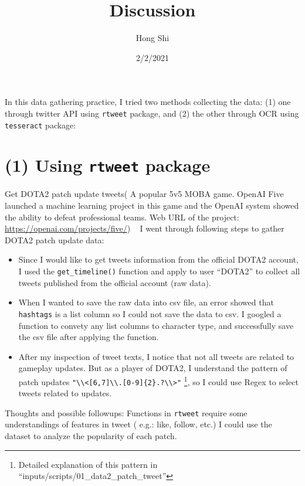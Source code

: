 \documentclass[
]{article}
\title{Discussion}
\author{Hong Shi}
\date{2/2/2021}
\begin{document}
\maketitle

In this data gathering practice, I tried two methods collecting the
data: (1) one through twitter API using \texttt{rtweet} package, and (2)
the other through OCR using \texttt{tesseract} package:

\hypertarget{using-rtweet-package}{%
\section{\texorpdfstring{(1) Using \texttt{rtweet}
package}{(1) Using rtweet package}}\label{using-rtweet-package}}

Get DOTA2 patch update tweets( A popular 5v5 MOBA game. OpenAI Five
launched a machine learning project in this game and the OpenAI system
showed the ability to defeat professional teams. Web URL of the project:
\url{https://openai.com/projects/five/}) ~ I went through following
steps to gather DOTA2 patch update data:

\begin{itemize}
\item
  Since I would like to get tweets information from the official DOTA2
  account, I used the \texttt{get\_timeline()} function and apply to
  user ``DOTA2'' to collect all tweets published from the official
  account (raw data).
\item
  When I wanted to save the raw data into csv file, an error showed that
  \texttt{hashtags} is a list column so I could not save the data to
  csv. I googled a function to convety any list columns to character
  type, and successfully save the csv file after applying the function.
\item
  After my inspection of tweet texts, I notice that not all tweets are
  related to gameplay updates. But as a player of DOTA2, I understand
  the pattern of patch updates
  \texttt{"\textbackslash{}\textbackslash{}\textless{}{[}6,7{]}\textbackslash{}\textbackslash{}.{[}0-9{]}\{2\}.?\textbackslash{}\textbackslash{}\textgreater{}"}
  \footnote{Detailed explanation of this pattern in
    ``inputs/scripts/01\_data2\_patch\_tweet''}, so I could use Regex to
  select tweets related to updates.
\end{itemize}

Thoughts and possible followups: Functions in \texttt{rtweet} require
some understandings of features in tweet ( e.g.: like, follow, etc.) I
could use the dataset to analyze the popularity of each patch.
\end{document}
